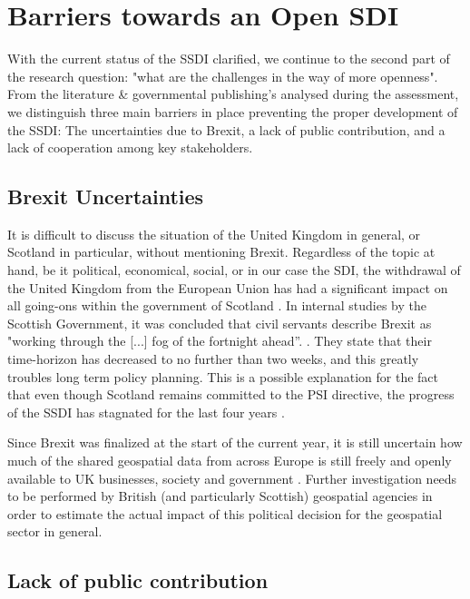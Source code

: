 
\section{Barriers towards an Open SDI}

With the current status of the SSDI clarified, we continue to the second part of the research question: "what are the challenges in the way of more openness". From the literature \& governmental publishing's analysed during the assessment, we distinguish three main barriers in place preventing the proper development of the SSDI: The uncertainties due to Brexit, a lack of public contribution, and a lack of cooperation among key stakeholders. 

\subsection{Brexit Uncertainties}

It is difficult to discuss the situation of the United Kingdom in general, or Scotland in particular, without mentioning Brexit. Regardless of the topic at hand, be it political, economical, social, or in our case the SDI, the withdrawal of the United Kingdom from the European Union has had a significant impact on all going-ons within the government of Scotland
\citep{impact_brexit}. In internal studies by the Scottish Government, it was concluded that civil servants describe Brexit as "working through the [...] fog of the fortnight ahead”. \citep{fog_of_brexit} . They state that their time-horizon has decreased to no further than two weeks, and this greatly troubles long term policy planning. This is a possible explanation for the fact that even though Scotland remains committed to the PSI directive, the progress of the SSDI has stagnated for the last four years \citep{impact_brexit}.

Since Brexit was finalized at the start of the current year, it is still uncertain how much of the shared geospatial data from across Europe is still freely and openly available to UK businesses, society and government \citep{impact_brexit}. Further investigation needs to be performed by British (and particularly Scottish) geospatial agencies in order to estimate the actual impact of this political decision for the geospatial sector in general.

\subsection{Lack of public contribution}

